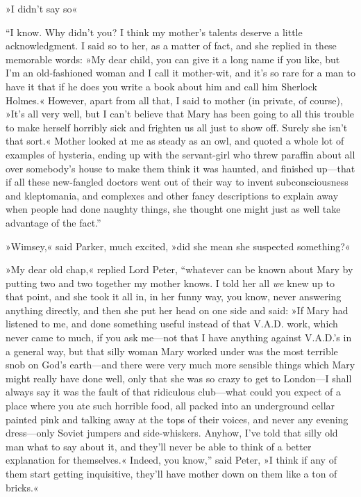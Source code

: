 »I didn't say so\longdash«

\enquote{I know. Why didn't you? I think my mother's talents deserve a little acknowledgment. I said so to her, as a matter of fact, and she replied in these memorable words: »My dear child, you can give it a long name if you like, but I'm an old-fashioned woman and I call it mother-wit, and it's so rare for a man to have it that if he does you write a book about him and call him Sherlock Holmes.« However, apart from all that, I said to mother (in private, of course), »It's all very well, but I can't believe that Mary has been going to all this trouble to make herself horribly sick and frighten us all just to show off. Surely she isn't that sort.« Mother looked at me as steady as an owl, and quoted a whole lot of examples of hysteria, ending up with the servant-girl who threw paraffin about all over somebody's house to make them think it was haunted, and finished up\allowbreak---\allowbreak that if all these new-fangled doctors went out of their way to invent subconsciousness and kleptomania, and complexes and other fancy descriptions to explain away when people had done naughty things, she thought one might just as well take advantage of the fact.}

»Wimsey,« said Parker, much excited, »did she mean she suspected something?«

»My dear old chap,« replied Lord Peter, \enquote{whatever can be known about Mary by putting two and two together my mother knows. I told her all \textit{we} knew up to that point, and she took it all in, in her funny way, you know, never answering anything directly, and then she put her head on one side and said: »If Mary had listened to me, and done something useful instead of that V.A.D. work, which never came to much, if you ask me\allowbreak---\allowbreak not that I have anything against V.A.D.'s in a general way, but that silly woman Mary worked under was the most terrible snob on God's earth\allowbreak---\allowbreak and there were very much more sensible things which Mary might really have done well, only that she was so crazy to get to London\allowbreak---\allowbreak I shall always say it was the fault of that ridiculous club\allowbreak---\allowbreak what could you expect of a place where you ate such horrible food, all packed into an underground cellar painted pink and talking away at the tops of their voices, and never any evening dress\allowbreak---\allowbreak only Soviet jumpers and side-whiskers. Anyhow, I've told that silly old man what to say about it, and they'll never be able to think of a better explanation for themselves.« Indeed, you know,} said Peter, »I think if any of them start getting inquisitive, they'll have mother down on them like a ton of bricks.«

